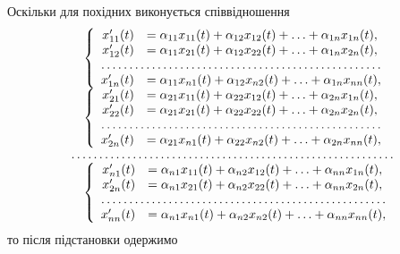 Оскільки для похідних виконується співвідношення
\begin{equation*}
\begin{array}{rl}
	& \left\{
		\begin{array}{rl}
			x_{11}'(t) &= \alpha_{11} x_{11} (t) + \alpha_{12} x_{12}(t) + \ldots + \alpha_{1n} x_{1n}(t), \\
			x_{12}'(t) &= \alpha_{11} x_{21} (t) + \alpha_{12} x_{22}(t) + \ldots + \alpha_{1n} x_{2n}(t), \\
			\hdotsfor{2} \\
			x_{1n}'(t) &= \alpha_{11} x_{n1} (t) + \alpha_{12} x_{n2}(t) + \ldots + \alpha_{1n} x_{nn}(t),
		\end{array}
	\right. \\
	& \left\{
		\begin{array}{rl}
			x_{21}'(t) &= \alpha_{21} x_{11} (t) + \alpha_{22} x_{12}(t) + \ldots + \alpha_{2n} x_{1n}(t), \\
			x_{22}'(t) &= \alpha_{21} x_{21} (t) + \alpha_{22} x_{22}(t) + \ldots + \alpha_{2n} x_{2n}(t), \\
			\hdotsfor{2} \\
			x_{2n}'(t) &= \alpha_{21} x_{n1} (t) + \alpha_{22} x_{n2}(t) + \ldots + \alpha_{2n} x_{nn}(t),
		\end{array}
	\right. \\
	\hdotsfor{2} \\
	& \left\{
		\begin{array}{rl}
			x_{n1}'(t) &= \alpha_{n1} x_{11} (t) + \alpha_{n2} x_{12}(t) + \ldots + \alpha_{nn} x_{1n}(t), \\
			x_{2n}'(t) &= \alpha_{n1} x_{21} (t) + \alpha_{n2} x_{22}(t) + \ldots + \alpha_{nn} x_{2n}(t), \\
			\hdotsfor{2} \\
			x_{nn}'(t) &= \alpha_{n1} x_{n1} (t) + \alpha_{n2} x_{n2}(t) + \ldots + \alpha_{nn} x_{nn}(t),
		\end{array}
	\right.
\end{array}
\end{equation*}
то після підстановки одержимо
